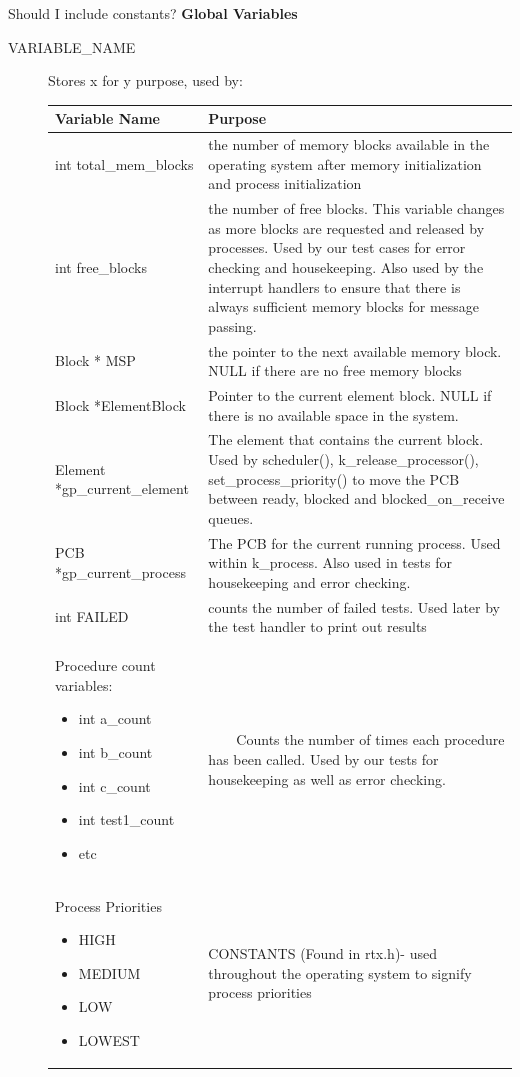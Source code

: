 \documentclass[11pt, oneside]{article}
\newcommand{\tabitem}{~~\llap{\textbullet}~~}
\begin{document}
Should I include constants? 
{\bf Global Variables}
\begin{description}
\item [VARIABLE\_NAME] Stores x for y purpose, used by:
\newline
\begin{longtable}{|L{5cm}|L{10.5cm}|} \hline
\textbf{Variable Name} & \textbf{Purpose} \\ \hline
int total\_mem\_blocks & the number of memory blocks available in the operating system after memory initialization and process initialization \\ \hline
int free\_blocks & the number of free blocks. This variable changes as more blocks are requested and released by processes. Used by our test cases for error checking and housekeeping. Also used by the interrupt handlers to ensure that there is always sufficient memory blocks for message passing. \\ \hline
Block * MSP & the pointer to the next available memory block. NULL if there are no free memory blocks \\ \hline
Block *ElementBlock & Pointer to the current element block. NULL if there is no available space in the system. \\ \hline
Element *gp\_current\_element & The element that contains the current block. Used by scheduler(), k\_release\_processor(), set\_process\_priority() to move the PCB between ready, blocked and blocked\_on\_receive queues. \\ \hline
PCB *gp\_current\_process & The PCB for the current running process. Used within k\_process. Also used in tests for housekeeping and error checking. \\ \hline
int FAILED & counts the number of failed tests. Used later by the test handler to print out results \\ \hline
Procedure count variables:
\begin{itemize}
\item int a\_count
\item int b\_count
\item int c\_count
\item int test1\_count
\item etc
\end{itemize} & \tabitem Counts the number of times each procedure has been called. Used by our tests for housekeeping as well as error checking. \\ \hline

Process Priorities 
\begin{itemize}
\item HIGH
\item MEDIUM
\item LOW
\item LOWEST
\end{itemize}
& CONSTANTS (Found in rtx.h)- used throughout the operating system to signify process priorities\\ \hline

\end{longtable}
\end{description}
\end{document}
